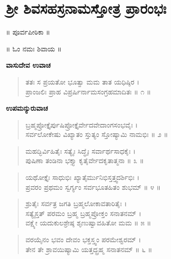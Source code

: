 
\chapter{ಶ್ರೀ ಶಿವಸಹಸ್ರನಾಮಸ್ತೋತ್ರ ಪ್ರಾರಂಭಃ}

\begin{center}
॥ ಪೂರ್ವಪೀಠಿಕಾ ॥
\end{center}

\begin{center}
॥ ಓಂ ನಮಃ ಶಿವಾಯ ॥
\end{center}

\begin{center}
\textbf{ವಾಸುದೇವ ಉವಾಚ}
\end{center}

\begin{verse}
ತತಃ ಸ ಪ್ರಯತೋ ಭೂತ್ವಾ ಮಮ ತಾತ ಯಧಿಷ್ಠಿರ ।\\ಪ್ರಾಂಜಲಿಃ ಪ್ರಾಹ ವಿಪ್ರರ್ಷಿರ್ನಾಮಸಂಗ್ರಹಮಾದಿತಃ \num{॥ ೧ ॥}
\end{verse}

\begin{center}
\textbf{ಉಪಮನ್ಯುರುವಾಚ}
\end{center}

\begin{verse}
ಬ್ರಹ್ಮಪ್ರೋಕ್ತೈರ್ಪುಷಿಪ್ರೋಕ್ತೈರ್ವೇದವೇದಾಂಗಸಂಭವೈಃ ।\\ಸರ್ವಲೋಕೇಷು ವಿಖ್ಯಾತಂ ಸ್ತುತ್ಯಂ ಸ್ತೋಷ್ಯಾಮಿ ನಾಮಭಿಃ \num{॥ ೨ ॥}
\end{verse}

\begin{verse}
ಮಹದ್ಭಿರ್ವಿಹಿತೈಃ ಸತ್ಯೈಃ ಸಿದ್ಧೈಃ ಸರ್ವಾರ್ಥಸಾಧಕೈಃ ।\\ಪುಷಿಣಾ ತಂಡಿನಾ ಭಕ್ತ್ಯಾ ಕೃತೈರ್ವೇದಕೃತಾತ್ಮನಾ \num{॥ ೩ ॥}
\end{verse}

\begin{verse}
ಯಥೋಕ್ತೈಃ ಸಾಧುಭಿಃ ಖ್ಯಾತೈರ್ಮುನಿಭಿಸ್ತತ್ತ್ವದರ್ಶಿಭಿಃ ।\\ಪ್ರವರಂ ಪ್ರಥಮಂ ಸ್ವರ್ಗ್ಯಂ ಸರ್ವಭೂತಹಿತಂ ಶುಭಮ್ \num{॥ ೪ ॥}
\end{verse}

\begin{verse}
ಶ್ರುತೈಃ ಸರ್ವತ್ರ ಜಗತಿ ಬ್ರಹ್ಮಲೋಕಾವತಾರಿತೈಃ ।\\ಸತ್ಯೈಸ್ತತ್ ಪರಮಂ ಬ್ರಹ್ಮ ಬ್ರಹ್ಮಪ್ರೋಕ್ತಂ ಸನಾತನಮ್ ।\\ವಕ್ಷ್ಯೇ ಯದುಕುಲಶ್ರೇಷ್ಠ ಶೃಣುಷ್ವಾವಹಿತೋ ಮಮ \num{॥ ೫ ॥}
\end{verse}

\begin{verse}
ವರಯೈನಂ ಭವಂ ದೇವಂ ಭಕ್ತಸ್ತ್ವಂ ಪರಮೇಶ್ವರಮ್ ।\\ತೇನ ತೇ ಶ್ರಾವಯಿಷ್ಯಾಮಿ ಯತ್ತದ್ಬ್ರಹ್ಮ ಸನಾತನಮ್ \num{॥ ೬ ॥}
\end{verse}

